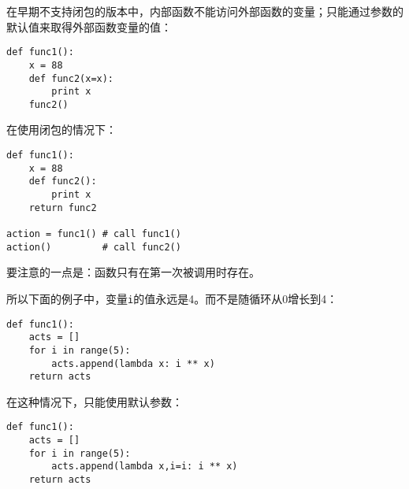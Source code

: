		在早期不支持闭包的版本中，内部函数不能访问外部函数的变量；只能通过参数的默认值来取得外部函数变量的值：

\begin{lstlisting}
def func1():
	x = 88
	def func2(x=x):
		print x
	func2()
\end{lstlisting}

		在使用闭包的情况下：

\begin{lstlisting}
def func1():
	x = 88
	def func2():
		print x
	return func2

action = func1() # call func1()
action()         # call func2()
\end{lstlisting}

		要注意的一点是：函数只有在第一次被调用时存在。
		
		所以下面的例子中，变量\verb|i|的值永远是4。而不是随循环从0增长到4：

\begin{lstlisting}
def func1():
	acts = []
	for i in range(5):
		acts.append(lambda x: i ** x)
	return acts
\end{lstlisting}

		在这种情况下，只能使用默认参数：

\begin{lstlisting}
def func1():
	acts = []
	for i in range(5):
		acts.append(lambda x,i=i: i ** x)
	return acts
\end{lstlisting}

